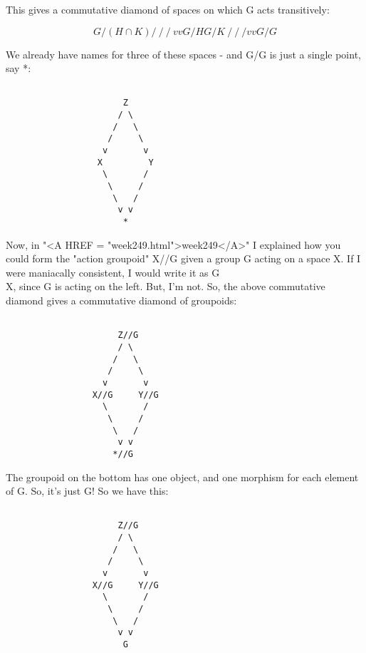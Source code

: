 This gives a commutative diamond of spaces on which G acts 
transitively:


$$

                     G/(H\cap K)
                      / \
                     /   \
                    /     \
                   v       v
                 G/H      G/K
                   \       /
                    \     /
                     \   /
                      v v
                      G/G
$$
    
We already have names for three of these spaces - and G/G is just
a single point, say *:


\begin{verbatim}

                       Z
                      / \
                     /   \
                    /     \
                   v       v
                  X         Y
                   \       /
                    \     /
                     \   /
                      v v
                       *
\end{verbatim}
    
Now, in "<A HREF = "week249.html">week249</A>" I explained how you could form the "action groupoid"
X//G given a group G acting on a space X.  If I were maniacally 
consistent, I would write it as G\\X, since G is acting on the left.  
But, I'm not.  So, the above commutative diamond gives a commutative 
diamond of groupoids:


\begin{verbatim}

                      Z//G
                      / \
                     /   \
                    /     \
                   v       v
                 X//G     Y//G
                   \       /
                    \     /
                     \   /
                      v v
                     *//G
\end{verbatim}
    
The groupoid on the bottom has one object, and one morphism for each
element of G.  So, it's just G!  So we have this:


\begin{verbatim}

                      Z//G
                      / \
                     /   \
                    /     \
                   v       v
                 X//G     Y//G
                   \       /
                    \     /
                     \   /
                      v v
                       G
\end{verbatim}
    
